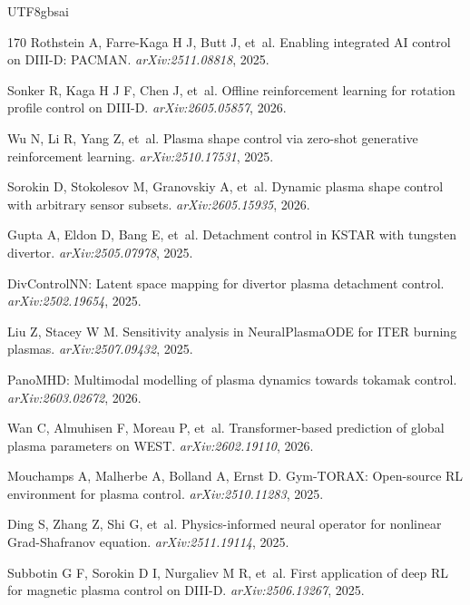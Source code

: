 \documentclass[12pt,a4paper]{article}
\begin{document}
\begin{CJK}{UTF8}{gbsai}
\begin{thebibliography}{170}
Rothstein A, Farre-Kaga H J, Butt J, et~al.
\newblock Enabling integrated AI control on DIII-D: PACMAN.
\newblock \textit{arXiv:2511.08818}, 2025.

Sonker R, Kaga H J F, Chen J, et~al.
\newblock Offline reinforcement learning for rotation profile control on DIII-D.
\newblock \textit{arXiv:2605.05857}, 2026.

Wu N, Li R, Yang Z, et~al.
\newblock Plasma shape control via zero-shot generative reinforcement learning.
\newblock \textit{arXiv:2510.17531}, 2025.

Sorokin D, Stokolesov M, Granovskiy A, et~al.
\newblock Dynamic plasma shape control with arbitrary sensor subsets.
\newblock \textit{arXiv:2605.15935}, 2026.

Gupta A, Eldon D, Bang E, et~al.
\newblock Detachment control in KSTAR with tungsten divertor.
\newblock \textit{arXiv:2505.07978}, 2025.

DivControlNN: Latent space mapping for divertor plasma detachment control.
\newblock \textit{arXiv:2502.19654}, 2025.

Liu Z, Stacey W M.
\newblock Sensitivity analysis in NeuralPlasmaODE for ITER burning plasmas.
\newblock \textit{arXiv:2507.09432}, 2025.

PanoMHD: Multimodal modelling of plasma dynamics towards tokamak control.
\newblock \textit{arXiv:2603.02672}, 2026.

Wan C, Almuhisen F, Moreau P, et~al.
\newblock Transformer-based prediction of global plasma parameters on WEST.
\newblock \textit{arXiv:2602.19110}, 2026.

Mouchamps A, Malherbe A, Bolland A, Ernst D.
\newblock Gym-TORAX: Open-source RL environment for plasma control.
\newblock \textit{arXiv:2510.11283}, 2025.

Ding S, Zhang Z, Shi G, et~al.
\newblock Physics-informed neural operator for nonlinear Grad-Shafranov equation.
\newblock \textit{arXiv:2511.19114}, 2025.

Subbotin G F, Sorokin D I, Nurgaliev M R, et~al.
\newblock First application of deep RL for magnetic plasma control on DIII-D.
\newblock \textit{arXiv:2506.13267}, 2025.


\end{thebibliography}
\end{CJK}
\end{document}
